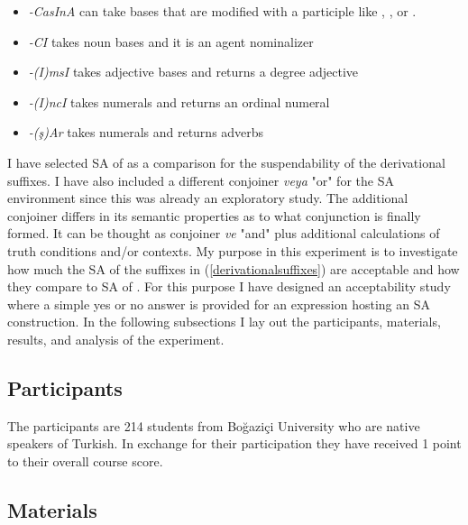 \begin{exe}
\ex \label{suffixesdiffer}
\begin{itemize}
\item \textit{-CasInA} can take bases that are modified with a participle like {\Prf}, {\Prog}, or {\Aor}. 

\item \textit{-CI} takes noun bases and it is an agent nominalizer

\item \textit{-(I)msI} takes adjective bases and returns a degree adjective

\item \textit{-(I)ncI} takes numerals and returns an ordinal numeral

\item \textit{-(ş)Ar} takes numerals and returns adverbs

\end{itemize}
\end{exe}

I have selected SA of {\Acc} as a comparison for the suspendability of the derivational suffixes. I have also included a different conjoiner \textit{veya} "or" for the SA environment since this was already an exploratory study. The additional conjoiner differs in its semantic properties as to what conjunction is finally formed. It can be thought as conjoiner \textit{ve} "and" plus additional calculations of truth conditions and/or contexts. My purpose in this experiment is to investigate how much the SA of the suffixes in (\ref{derivationalsuffixes}) are acceptable and how they compare to SA of {\Acc}. For this purpose I have designed an acceptability study where a simple yes or no answer is provided for an expression hosting an SA construction. In the following subsections I lay out the participants, materials, results, and analysis of the experiment.

\subsection{Participants}

The participants are 214 students from Boğaziçi University who are native speakers of Turkish. In exchange for their participation they have received 1 point to their overall course score.

\subsection{Materials}

